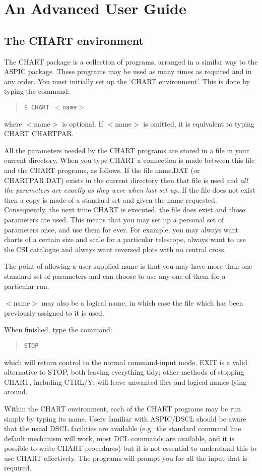 \documentclass{article}
\begin{document}
\section{An Advanced User Guide}
\subsection{The CHART environment}
\label{env}
The CHART package is a collection of programs, arranged in a similar way to the
ASPIC package.
These programs may be used as many times as required and in any order.
You must initially set up the `CHART environment'.
This is done by typing the command:
\begin{quote}
{\tt \$ CHART $<$name$>$}
\end{quote}
where $<$name$>$ is optional.
If $<$name$>$ is omitted, it is equivalent to typing  CHART CHARTPAR.

All the parameters needed by the CHART programs are stored in a file in your
current directory.
When you type CHART a connection is made between this file and the CHART
programs, as follows.
If the file name.DAT (or CHARTPAR.DAT) exists in the current directory then that
file is used and {\em all the parameters are exactly as they were when last 
set up.}
If the file does not exist then a copy is made of a standard set and given the
name requested.
Consequently, the next time CHART is executed, the file does exist and those
parameters are used.
This means that you may set up a personal set of parameters once, and use them
for ever.
For example, you may always want charts of a certain size and scale for a
particular telescope, always want to use the CSI catalogue and always want
reversed plots with no central cross.

The point of allowing a user-supplied name is that you may have more than one
standard set of parameters and can choose to use any one of them for a
particular run.

$<$name$>$ may also be a logical name, in which case the file which has been
previously assigned to it is used.

When finished, type the command:
\begin{quote}
{\tt STOP}
\end{quote}
which will return control to the normal command-input mode.
EXIT is a valid alternative to STOP, both leaving everything tidy; other methods
of stopping CHART, including CTRL/Y, will leave unwanted files and logical
names lying around.

Within the CHART environment, each of the CHART programs may be run simply by
typing its name.
Users familiar with ASPIC/DSCL should be aware that the usual DSCL facilities
are available (e.g.\ the standard command line default mechanism will work, most
DCL commands are available, and it is possible to write CHART procedures) but it
is not essential to understand this to use CHART effectively.
The programs will prompt you for all the input that is required.
\end{document}
